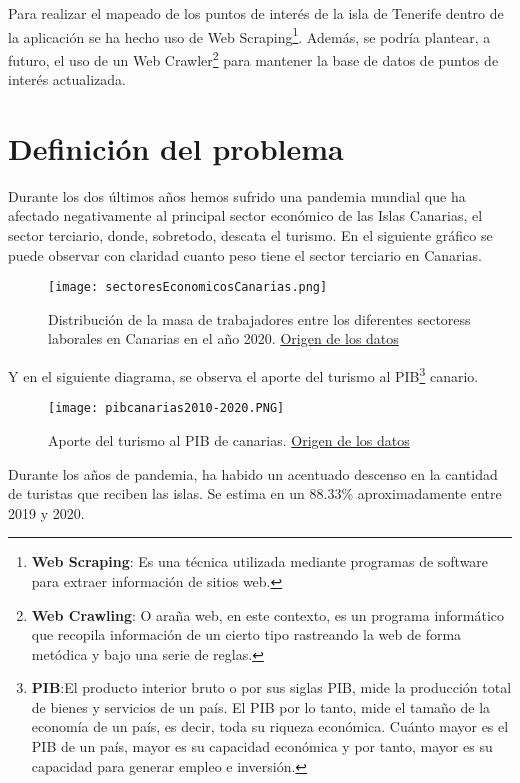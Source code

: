 \documentclass{report}
\begin{document}
Para realizar el mapeado de los puntos de interés de la isla de Tenerife dentro de la aplicación se ha hecho uso de Web Scraping\footnote{\textbf{Web Scraping}: Es una técnica utilizada mediante programas de software para extraer información de sitios web.}. Además, se podría plantear, a futuro, el uso de un Web Crawler\footnote{\textbf{Web Crawling}: O araña web, en este contexto, es un programa informático que recopila información de un cierto tipo rastreando la web de forma metódica y bajo una serie de reglas.} para mantener la base de datos de puntos de interés actualizada.

\section{Definición del problema}
Durante los dos últimos años hemos sufrido una pandemia mundial que ha afectado negativamente al principal sector económico de las Islas Canarias, el sector terciario, donde, sobretodo, descata el turismo. En el siguiente gráfico se puede observar con claridad cuanto peso tiene el sector terciario en Canarias.

\begin{figure}[H]
    \centering
    \texttt{[image: sectoresEconomicosCanarias.png]}
    \caption{Distribución de la masa de trabajadores entre los diferentes sectoress laborales en Canarias en el año 2020. \href{https://www3.gobiernodecanarias.org/medusa/ecoblog/jmhergare/2020/04/14/sociales-los-sectores-economicos/}{Origen de los datos}}
    \label{fig:mapaCompleto}
\end{figure}

Y en el siguiente diagrama, se observa el aporte del turismo al PIB\footnote{\textbf{PIB}:El producto interior bruto o por sus siglas PIB, mide la producción total de bienes y servicios de un país. El PIB por lo tanto, mide el tamaño de la economía de un país, es decir, toda su riqueza económica. Cuánto mayor es el PIB de un país, mayor es su capacidad económica y por tanto, mayor es su capacidad para generar empleo e inversión.} canario.
\begin{figure}[H]
    \centering
    \texttt{[image: pibcanarias2010-2020.PNG]}
    \caption{Aporte del turismo al PIB de canarias. \href{https://es.statista.com/estadisticas/526585/aportacion-del-turismo-al-pib-de-canarias/}{Origen de los datos}}
    \label{fig:mapaCompleto}
\end{figure}

Durante los años de pandemia, ha habido un acentuado descenso en la cantidad de turistas que reciben las islas. Se estima en un 88.33\% aproximadamente entre 2019 y 2020. 
\end{document}
